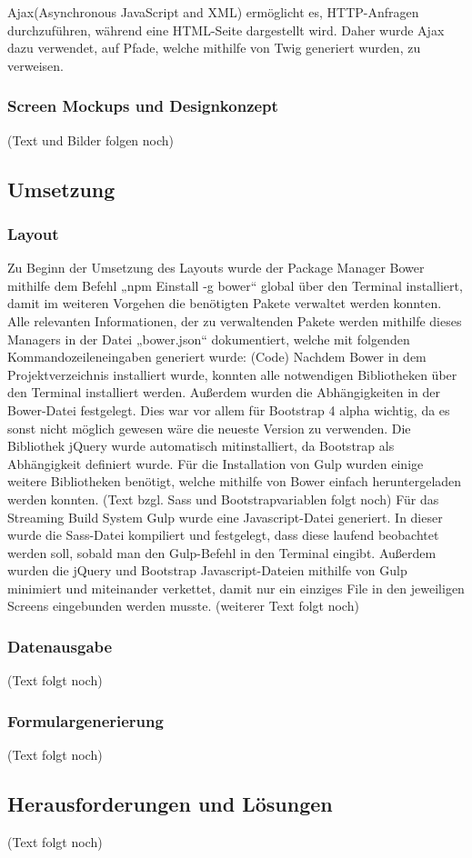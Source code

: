 Ajax(Asynchronous JavaScript and XML) ermöglicht es, HTTP-Anfragen durchzuführen, während eine HTML-Seite dargestellt wird. Daher wurde Ajax dazu verwendet, auf Pfade, welche mithilfe von Twig generiert wurden, zu verweisen.
    
    \subsubsection{Screen Mockups und Designkonzept}

(Text und Bilder folgen noch)

  \subsection{Umsetzung}

    \subsubsection{Layout}

Zu Beginn der Umsetzung des Layouts wurde der Package Manager Bower mithilfe dem Befehl „npm Einstall -g bower“ global über den Terminal installiert, damit im weiteren Vorgehen die benötigten Pakete verwaltet werden konnten. Alle relevanten Informationen, der zu verwaltenden Pakete werden mithilfe dieses Managers in der Datei „bower.json“ dokumentiert, welche mit folgenden Kommandozeileneingaben generiert wurde:
(Code)
Nachdem Bower in dem Projektverzeichnis installiert wurde, konnten alle notwendigen Bibliotheken über den Terminal installiert werden. Außerdem wurden die Abhängigkeiten in der Bower-Datei festgelegt. Dies war vor allem für Bootstrap 4 alpha wichtig, da es sonst nicht möglich gewesen wäre die neueste Version zu verwenden. Die Bibliothek jQuery wurde automatisch mitinstalliert, da Bootstrap als Abhängigkeit definiert wurde. Für die Installation von Gulp wurden einige weitere Bibliotheken benötigt, welche mithilfe von Bower einfach heruntergeladen werden konnten. 
(Text bzgl. Sass und Bootstrapvariablen folgt noch)
Für das Streaming Build System Gulp wurde eine Javascript-Datei generiert. In dieser wurde die Sass-Datei kompiliert und festgelegt, dass diese laufend beobachtet werden soll, sobald man den Gulp-Befehl in den Terminal eingibt. Außerdem wurden die jQuery und Bootstrap Javascript-Dateien mithilfe von Gulp minimiert und miteinander verkettet, damit nur ein einziges File in den jeweiligen Screens eingebunden werden musste.
(weiterer Text folgt noch)

    \subsubsection{Datenausgabe}

(Text folgt noch)

    \subsubsection{Formulargenerierung}

(Text folgt noch)

  \subsection{Herausforderungen und Lösungen}
  
(Text folgt noch)



